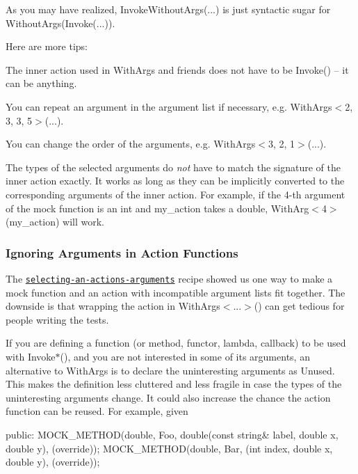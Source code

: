 As you may have realized, {\ttfamily Invoke\+Without\+Args(...)} is just syntactic sugar for {\ttfamily Without\+Args(Invoke(...))}.

Here are more tips\+:


\begin{DoxyItemize}
\item The inner action used in {\ttfamily With\+Args} and friends does not have to be {\ttfamily Invoke()} -- it can be anything.
\item You can repeat an argument in the argument list if necessary, e.\+g. {\ttfamily With\+Args$<$2, 3, 3, 5$>$(...)}.
\item You can change the order of the arguments, e.\+g. {\ttfamily With\+Args$<$3, 2, 1$>$(...)}.
\item The types of the selected arguments do {\itshape not} have to match the signature of the inner action exactly. It works as long as they can be implicitly converted to the corresponding arguments of the inner action. For example, if the 4-\/th argument of the mock function is an {\ttfamily int} and {\ttfamily my\+\_\+action} takes a {\ttfamily double}, {\ttfamily With\+Arg$<$4$>$(my\+\_\+action)} will work.
\end{DoxyItemize}

\subsubsection*{Ignoring Arguments in Action Functions}

The \href{#SelectingArgs}{\tt selecting-\/an-\/action\textquotesingle{}s-\/arguments} recipe showed us one way to make a mock function and an action with incompatible argument lists fit together. The downside is that wrapping the action in {\ttfamily With\+Args$<$...$>$()} can get tedious for people writing the tests.

If you are defining a function (or method, functor, lambda, callback) to be used with {\ttfamily Invoke$\ast$()}, and you are not interested in some of its arguments, an alternative to {\ttfamily With\+Args} is to declare the uninteresting arguments as {\ttfamily Unused}. This makes the definition less cluttered and less fragile in case the types of the uninteresting arguments change. It could also increase the chance the action function can be reused. For example, given


\begin{DoxyCode}
\textcolor{keyword}{public}:
 MOCK\_METHOD(\textcolor{keywordtype}{double}, Foo, \textcolor{keywordtype}{double}(\textcolor{keyword}{const} \textcolor{keywordtype}{string}& label, \textcolor{keywordtype}{double} x, \textcolor{keywordtype}{double} y),
             (\textcolor{keyword}{override}));
 MOCK\_METHOD(\textcolor{keywordtype}{double}, Bar, (\textcolor{keywordtype}{int} index, \textcolor{keywordtype}{double} x, \textcolor{keywordtype}{double} y), (\textcolor{keyword}{override}));
\end{DoxyCode}


